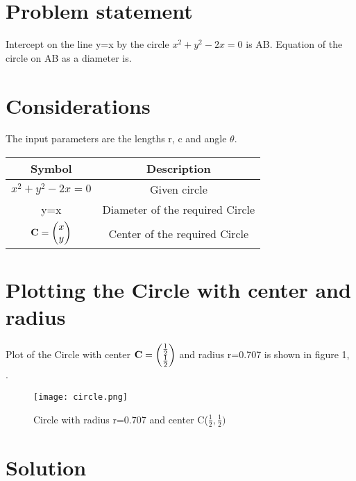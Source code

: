 \documentclass[journal,10pt,twocolumn]{article}
\begin{document}
\section{Problem statement}
Intercept on the line y=x by the circle $x^2+y^2-2x=0$ is AB. Equation of the circle on AB as a diameter is.
\section{Considerations}
\vspace{0.2cm}
The input parameters are the lengths r, c and angle $\theta$. \\
\vspace{0.2cm}
{
\setlength\extrarowheight{2pt}
\begin{tabular}{|c|c|}
	\hline
	\textbf{Symbol}&\textbf{Description}\\
	\hline
	$x^2+y^2-2x=0$ 
	&Given circle\\
	\hline
	y=x&Diameter of the required Circle\\
	\hline
	$\mathbf{C}=\begin{pmatrix}x \\ y\end{pmatrix}$ &Center of the required Circle
	\\
\hline
\end{tabular}
}
\section{Plotting the Circle with center and radius}
\vspace{0.25cm}
Plot of the Circle with center $\mathbf{C} =\begin{pmatrix}\frac{1}{2} \\ \frac{1}{2}\end{pmatrix}$ and radius r=0.707  is shown in figure 1, .
\begin{figure}[h]
\texttt{[image: circle.png]}
\caption{Circle with radius r=0.707 and center C($\frac{1}{2}, \frac{1}{2})$}
\label{fig:Circle with radius and center}
\end{figure}
\section{Solution}
\vspace{0.25cm}
\end{document}
